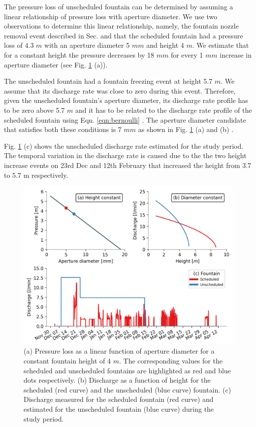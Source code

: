 \documentclass[tc, manuscript]{copernicus}
\begin{document}
The pressure loss of unscheduled fountain can be determined by assuming a linear relationship of pressure loss
with aperture diameter. We use two observations to determine this linear relationship, namely, the fountain
nozzle removal event described in Sec. and that the scheduled fountain had a pressure loss of 4.3 $m$ with an
aperture diameter 5 $mm$ and height 4 $m$. We estimate that for a constant height the pressure decreases by 18
$mm$ for every 1 $mm$ increase in aperture diameter (see Fig. \ref{fig:fountains} (a)).

The unscheduled fountain had a fountain freezing event at height 5.7 $m$. We assume that its discharge rate was
close to zero during this event. Therefore, given the unscheduled fountain's aperture diameter, its discharge
rate profile has to be zero above 5.7 $m$ and it has to be related to the discharge rate profile of the
scheduled fountain using Eqn. \ref{eqn:bernoulli} . The aperture diameter candidate that satisfies both these
conditions is 7 $mm$ as shown in Fig. \ref{fig:fountains} (a) and (b) .

Fig. \ref{fig:fountains} (c) shows the unscheduled discharge rate estimated for the study period. The temporal
variation in the discharge rate is caused due to the the two height increase events on 23rd Dec and 12th
February that increased the height from 3.7 to 5.7 m respectively.

\begin{figure}[t]
\includegraphics[width=12cm]{Figures/fountains.png}

\caption{ (a) Pressure loss as a linear function of aperture diameter for a constant fountain height of 4 $m$.
The corresponding values for the scheduled and unscheduled fountains are highlighted as red and blue dots
respectively. (b) Discharge as a function of height for the scheduled (red curve) and the unscheduled (blue
curve) fountain. (c) Discharge measured for the scheduled fountain (red curve) and estimated for the unscheduled
fountain (blue curve) during the study period.}

\label{fig:fountains}
\end{figure}
\end{document}
